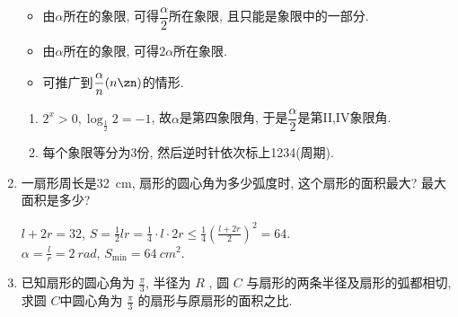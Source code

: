 \begin{enumerate}
\begin{jieda}
\begin{itemize}
\item 由$\alpha$所在的象限, 可得$\dfrac{\alpha}{2}$所在象限, 且只能是象限中的一部分. 
\item 由$\alpha$所在的象限, 可得$2\alpha$所在象限. 
\item 可推广到$\dfrac{\alpha}{n}(n\zn)$的情形. 
\end{itemize}

\begin{enumerate}[(1)]
\item $2^x>0, \log_{\frac{1}{2}}2=-1$, 故$\alpha$是第四象限角, 于是$\dfrac{\alpha}{2}$是第II,IV象限角. 

\item 每个象限等分为3份, 然后逆时针依次标上1234(周期). 

\end{enumerate}

\end{jieda}



\item 一扇形周长是\SI{32}{cm}, 扇形的圆心角为多少弧度时, 这个扇形的面积最大? 最大面积是多少? 
\begin{jieda}
$l+2r=32$, $S=\frac{1}{2}lr=\frac{1}{4}\cdot l\cdot2r\leq\frac{1}{4}(\frac{l+2r}{2})^2=64$. \\
$\alpha=\frac{l}{r}=\SI{2}{rad}$, $S_{\min}=\SI{64}{cm^2}$. 
\end{jieda}


\item 已知扇形的圆心角为 $\frac{\pi}{3}$, 半径为 $R$ , 圆 $C$ 与扇形的两条半径及扇形的弧都相切, 求圆 $C $中圆心角为 $\frac{\pi}{3}$ 的扇形与原扇形的面积之比.

\end{enumerate}

